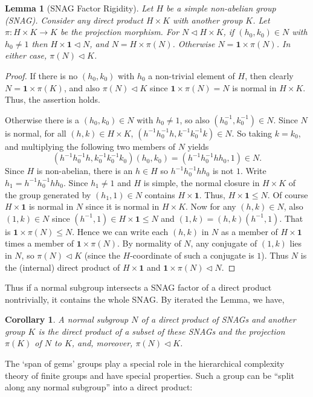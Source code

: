 \documentclass[a4paper,11pt]{amsart}
\newtheorem{lemma}[theorem]{Lemma}
\newtheorem{corollary}[theorem]{Corollary}
\theoremstyle{definition}
\newcommand{\1}{{\mathbf 1}}
\begin{document}
\begin{lemma}[SNAG Factor Rigidity]\label{SNAGrigidity}
Let $H$ be a simple non-abelian group (SNAG). Consider any direct product $H\times K$ with another group $K$. Let $\pi: H\times K \rightarrow K$ be the projection morphism. 
For $N \lhd H\times K$, if $(h_0, k_0) \in N$ with $h_0\neq 1$ then $H\times \1 \lhd N$, and
 $N=H \times \pi(N)$. Otherwise $N=\1 \times \pi(N)$. In either case, $\pi(N)\lhd K$.
\end{lemma}
\begin{proof} If there is no $(h_0,k_0)$ with $h_0$ a non-trivial element of $H$, then clearly $N=\1 \times \pi(K)$, and also  $\pi(N) \lhd K$ since $\1\times \pi(N)=N$ is normal in $H\times K$. Thus, the assertion holds.

Otherwise there is a $(h_0,k_0)\in N$  with $h_0 \neq 1$, so also $(h_0^{-1}, k_0^{-1})\in N$. Since $N$ is normal, for all $(h,k)\in H\times K$,
 $(h^{-1}h_0^{-1}h, k^{-1}k_0^{-1}k) \in N$. So taking $k=k_0$, and multiplying the following two members of $N$ yields
$$(h^{-1}h_0^{-1}h, k_0^{-1}k_0^{-1}k_0)(h_0, k_0)=(h^{-1}h_0^{-1}h h_0,1) \in N.$$
Since $H$ is non-abelian, there is an $h\in H$ so $h^{-1}h_0^{-1}h h_0$ is not $1$. Write $h_1=h^{-1}h_0^{-1}h h_0$.  Since $h_1\neq 1$ and $H$ is simple, the normal closure in $H\times K$ of the group generated by $(h_1,1) \in N$ contains $H\times \1$. Thus, $H\times\1 \leq N$. Of course $H\times \1$ is normal in $N$ since it is normal in $H\times K$.  
Now for any $(h,k) \in N$, also $(1,k)\in N$ since $(h^{-1}, 1) \in H\times \1 \leq N$ and $(1,k)=(h,k)(h^{-1},1)$.  That is $\1 \times \pi(N) \leq N$. 
Hence we can write each $(h,k)$ in $N$ as a member of $H\times \1$ times a member of $\1\times \pi(N)$. By normality of $N$, any conjugate of $(1,k)$ lies in $N$, so $\pi(N)\lhd K$ (since the $H$-coordinate of such a conjugate is $1$).  Thus $N$ is the (internal) direct product of $H\times \1$ and 
$\1 \times \pi(N) \lhd N$. 
\end{proof}
Thus if a normal subgroup intersects a SNAG factor of a direct product nontrivially, it contains the whole SNAG. By iterated the Lemma, we have, 
\begin{corollary}
A normal subgroup $N$ of a direct product of SNAGs and another group $K$ is the direct product of a subset of these SNAGs and the projection $\pi(K)$ of $N$ to $K$, and, moreover, $\pi(N)\lhd K$.
\end{corollary}

 
 The `span of gems' groups play a special role in the hierarchical complexity theory of finite groups and have special properties.
 Such a group can be ``split along any normal subgroup'' into a direct product:
 
\end{document}
